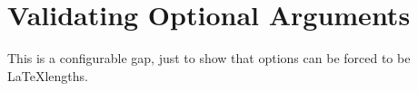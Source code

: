 \documentclass{article}
\begin{document}
\section*{Validating Optional Arguments}


This is a configurable \gap[rule,width=15mm] gap, just to show that options
can be forced to be \LaTeX \gap lengths.
\end{document}
